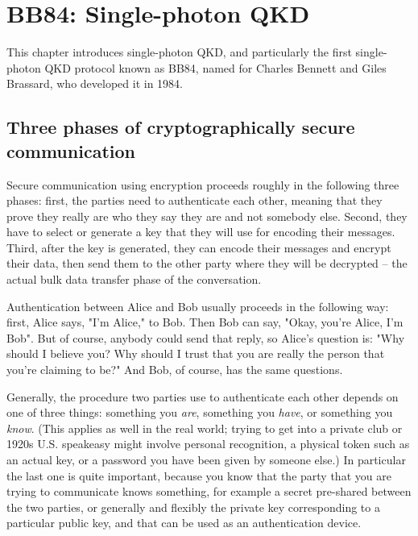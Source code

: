 \chapter{BB84: Single-photon QKD}

This chapter introduces single-photon QKD, and particularly the first single-photon QKD protocol known as BB84, named for Charles Bennett and Giles Brassard, who developed it in 1984.

\section{Three phases of cryptographically secure communication}


Secure communication using encryption proceeds roughly in the following three phases: first, the parties need to authenticate each other, meaning that they prove they really are who they say they are and not somebody else. Second, they have to select or generate a key that they will use for encoding their messages.  Third, after the key is generated, they can encode their messages and encrypt their data, then send them to the other party where they will be decrypted -- the actual bulk data transfer phase of the conversation.

Authentication between Alice and Bob usually proceeds in the following way: first, Alice says, "I'm Alice," to Bob. Then Bob can say, "Okay, you're Alice, I'm Bob". But of course, anybody could send that reply, so Alice's question is: "Why should I believe you? Why should I trust that you are really the person that you're claiming to be?" And Bob, of course, has the same questions.

Generally, the procedure two parties use to authenticate each other depends on one of three things: something you \emph{are}, something you \emph{have}, or something you \emph{know}. (This applies as well in the real world; trying to get into a private club or 1920s U.S. speakeasy might involve personal recognition, a physical token such as an actual key, or a password you have been given by someone else.)  In particular the last one is quite important, because you know that the party that you are trying to communicate knows something, for example a secret pre-shared between the two parties, or generally and flexibly the private key corresponding to a particular public key, and that can be used as an authentication device.

